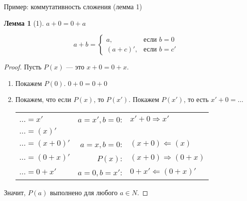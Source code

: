 \documentclass[aspectratio=169]{beamer}
\newtheorem{lmm}{Лемма}[section]
\begin{document}
\begin{frame}{Пример: коммутативность сложения (лемма 1)}

\begin{multicols}{2}
\begin{lmm}[1]
$a + 0 = 0 + a$
\end{lmm} \pause
{\color{gray}
$$a + b = \left\{ \begin{array}{ll} a, & \mbox{если } b = 0\\
                                    (a + c)', & \mbox{если } b = c'
                  \end{array}\right.$$} \end{multicols}\pause
\vspace{-1.5cm}\begin{proof} Пусть $P(x)$ --- это $x + 0 = 0 + x$.
\begin{enumerate}\pause
\item Покажем $P(0)$. $0 + 0 = 0 + 0$ \pause
\item Покажем, что если $P(x)$, то $P(x')$. Покажем $P(x')$, то есть $x' + 0 = \dots$ \pause

\begin{center}
  \begin{tabular}{lrl} %
                      $\dots = x'$ & $a=x',b=0$: & $x' + 0 \Rightarrow x'$ \\\pause
                      $\dots = (x)'$ & \\ \pause
                      $\dots = (x + 0)'$ & $a=x,b=0$: &$(x + 0) \Leftarrow (x)$ \\ \pause
                      $\dots = (0 + x)'$ & $P(x)$: &$(x + 0) \Rightarrow (0 + x)$ \\ \pause
                      $\dots = 0 + x'$ & $a=0,b=x'$: &$0 + x' \Leftarrow (0 + x)'$
   \end{tabular}
\end{center}
\end{enumerate}\pause
Значит, $P(a)$ выполнено для любого $a \in N$.
\end{proof}
\end{frame}
\end{document}
